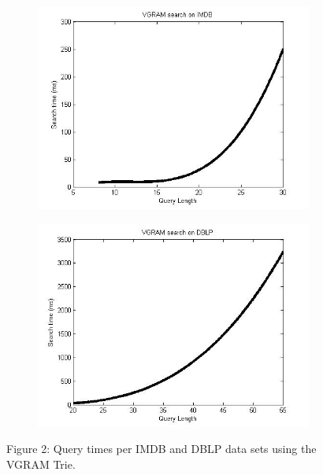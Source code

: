 \documentclass[pdftex,12pt,letter]{article}
\begin{document}
\begin{figure}[h!]
\centering
\begin{subfigure}[b]{0.45\textwidth}
\includegraphics[width=\textwidth]{VGRAMonIMDB.jpg}
\label{fig:imdb}
\end{subfigure}
\begin{subfigure}[b]{0.45\textwidth}
\includegraphics[width=\textwidth]{VGRAMonDBLP.jpg}
\label{fig:dblp}
\end{subfigure}
\begin{center}
Figure 2: Query times per IMDB and DBLP data sets using the VGRAM Trie.
\end{center}
\end{figure}
\end{document}
